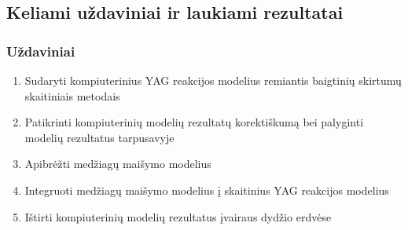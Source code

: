 \subsection{Keliami uždaviniai ir laukiami rezultatai}
\subsubsection{Uždaviniai}
\begin{enumerate}
  
    \item Sudaryti kompiuterinius YAG reakcijos modelius remiantis baigtinių skirtumų skaitiniais metodais
    \item Patikrinti kompiuterinių modelių rezultatų korektiškumą bei palyginti modelių rezultatus tarpusavyje
    \item Apibrėžti medžiagų maišymo modelius
    \item Integruoti medžiagų maišymo modelius į skaitinius YAG reakcijos modelius
    \item Ištirti kompiuterinių modelių rezultatus įvairaus dydžio erdvėse
\end{enumerate}